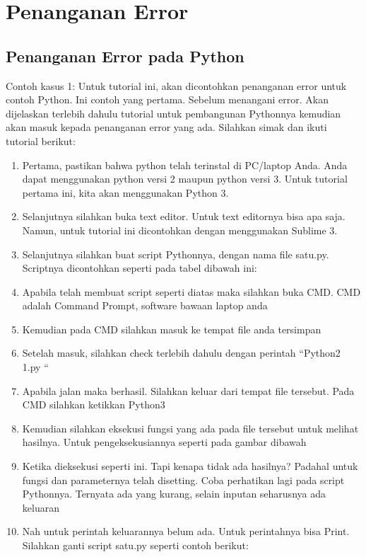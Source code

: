 \section{Penanganan Error}

\subsection{Penanganan Error pada Python}

Contoh kasus 1: Untuk tutorial ini, akan dicontohkan penanganan error untuk contoh Python. Ini contoh yang pertama. Sebelum menangani error. Akan dijelaskan terlebih dahulu tutorial untuk pembangunan Pythonnya kemudian akan masuk kepada penanganan error yang ada. Silahkan simak dan ikuti tutorial berikut:
\begin{enumerate}
\item Pertama, pastikan bahwa python telah terinstal di PC/laptop Anda. Anda dapat menggunakan python versi 2 maupun python versi 3. Untuk tutorial pertama ini, kita akan menggunakan Python 3.
\item Selanjutnya silahkan buka text editor. Untuk text editornya bisa apa saja. Namun, untuk tutorial ini dicontohkan dengan menggunakan Sublime 3.
\item Selanjutnya silahkan buat script Pythonnya, dengan nama file satu.py. Scriptnya dicontohkan seperti pada tabel dibawah ini:
\item Apabila telah membuat script seperti diatas maka silahkan buka CMD. CMD adalah Command Prompt, software bawaan laptop anda
\item Kemudian pada CMD silahkan masuk ke tempat file anda tersimpan
\item Setelah masuk, silahkan check terlebih dahulu dengan perintah “Python2 1.py “
\item Apabila jalan maka berhasil. Silahkan keluar dari tempat file tersebut. Pada CMD silahkan ketikkan Python3
\item Kemudian silahkan eksekusi fungsi yang ada pada file tersebut untuk melihat hasilnya. Untuk pengeksekusiannya seperti pada gambar dibawah 
\item Ketika dieksekusi seperti ini. Tapi kenapa tidak ada hasilnya? Padahal untuk fungsi dan parameternya telah disetting. Coba perhatikan lagi pada script Pythonnya. Ternyata ada yang kurang, selain inputan seharusnya ada keluaran
\item Nah untuk perintah keluarannya belum ada. Untuk perintahnya bisa Print. Silahkan ganti script satu.py seperti contoh berikut:

\end{enumerate}
